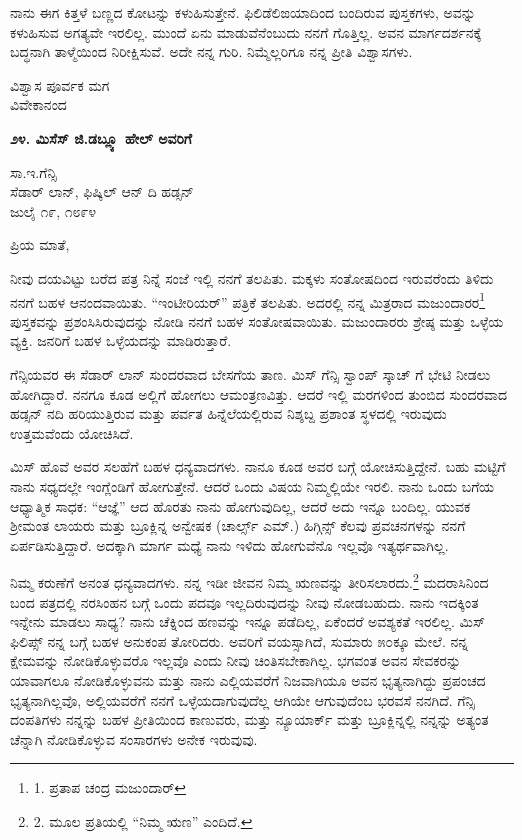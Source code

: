 ನಾನು ಈಗ ಕಿತ್ತಳೆ ಬಣ್ಣದ ಕೋಟನ್ನು ಕಳುಹಿಸುತ್ತೇನೆ. ಫಿಲಿಡೆಲಿಙಯಾದಿಂದ ಬಂದಿರುವ ಪುಸ್ತಕಗಳು, ಅವನ್ನು ಕಳುಹಿಸುವ ಅಗತ್ಯವೇ ಇರಲಿಲ್ಲ. ಮುಂದೆ ಏನು ಮಾಡುವೆನೆಂಬುದು ನನಗೆ ಗೊತ್ತಿಲ್ಲ. ಅವನ ಮಾರ್ಗದರ್ಶನಕ್ಕೆ ಬದ್ಧನಾಗಿ ತಾಳ್ಮೆಯಿಂದ ನಿರೀಕ್ಷಿಸುವೆ. ಅದೇ ನನ್ನ ಗುರಿ. ನಿಮ್ಮೆಲ್ಲರಿಗೂ ನನ್ನ ಪ್ರೀತಿ ವಿಶ್ವಾಸಗಳು.

\begin{flushright}
ವಿಶ್ವಾಸ ಪೂರ್ವಕ ಮಗ\\ವಿವೇಕಾನಂದ
\end{flushright}

\begin{center}
\textbf{೨೪. ಮಿಸೆಸ್ ಜಿ.ಡಬ್ಲ್ಯೂ ಹೇಲ್ ಅವರಿಗೆ}
\end{center}

\begin{flushright}
 ಸಾ.ಇ.ಗೆನ್ಸಿ\\ಸೆಡಾರ್ ಲಾನ್, ಫಿಷ್ಕಿಲ್ ಆನ್ ದಿ ಹಡ್ಸನ್\\ಜುಲೈ ೧೯, ೧೮೯೪
\end{flushright}

ಪ್ರಿಯ ಮಾತೆ,

ನೀವು ದಯವಿಟ್ಟು ಬರೆದ ಪತ್ರ ನಿನ್ನೆ ಸಂಜೆ ಇಲ್ಲಿ ನನಗೆ ತಲಪಿತು. ಮಕ್ಕಳು ಸಂತೋಷದಿಂದ ಇರುವರೆಂದು ತಿಳಿದು ನನಗೆ ಬಹಳ ಆನಂದವಾಯಿತು. “ಇಂಟೀರಿಯರ್” ಪತ್ರಿಕೆ ತಲಪಿತು. ಅದರಲ್ಲಿ ನನ್ನ ಮಿತ್ರರಾದ ಮಜುಂದಾರರ\footnote{1. ಪ್ರತಾಪ ಚಂದ್ರ ಮಜುಂದಾರ್} ಪುಸ್ತಕವನ್ನು ಪ್ರಶಂಸಿಸಿರುವುದನ್ನು ನೋಡಿ ನನಗೆ ಬಹಳ ಸಂತೋಷವಾಯಿತು. ಮಜುಂದಾರರು ಶ್ರೇಷ್ಠ ಮತ್ತು ಒಳ್ಳೆಯ ವ್ಯಕ್ತಿ. ಜನರಿಗೆ ಬಹಳ ಒಳ್ಳೆಯದನ್ನು ಮಾಡಿರುತ್ತಾರೆ.

ಗೆನ್ಸಿಯವರ ಈ ಸೆಡಾರ್ ಲಾನ್ ಸುಂದರವಾದ ಬೇಸಗೆಯ ತಾಣ. ಮಿಸ್ ಗೆನ್ಸಿ ಸ್ವಾಂಪ್ ಸ್ಕಾಚ್ ಗೆ ಭೇಟಿ ನೀಡಲು ಹೋಗಿದ್ದಾರೆ. ನನಗೂ ಕೂಡ ಅಲ್ಲಿಗೆ ಹೋಗಲು ಆಮಂತ್ರಣವಿತ್ತು. ಆದರೆ ಇಲ್ಲಿ ಮರಗಳಿಂದ ತುಂಬಿದ ಸುಂದರವಾದ ಹಡ್ಸನ್ ನದಿ ಹರಿಯುತ್ತಿರುವ ಮತ್ತು ಪರ್ವತ ಹಿನ್ನೆಲೆಯಲ್ಲಿರುವ ನಿಶ್ಶಬ್ದ ಪ್ರಶಾಂತ ಸ್ಥಳದಲ್ಲಿ ಇರುವುದು ಉತ್ತಮವೆಂದು ಯೋಚಿಸಿದೆ.

ಮಿಸ್ ಹೊವೆ ಅವರ ಸಲಹೆಗೆ ಬಹಳ ಧನ್ಯವಾದಗಳು. ನಾನೂ ಕೂಡ ಅವರ ಬಗ್ಗೆ ಯೋಚಿಸುತ್ತಿದ್ದೇನೆ. ಬಹು ಮಟ್ಟಿಗೆ ನಾನು ಸಧ್ಯದಲ್ಲೇ ಇಂಗ್ಲೆಂಡಿಗೆ ಹೋಗುತ್ತೇನೆ. ಆದರೆ ಒಂದು ವಿಷಯ ನಿಮ್ಮಲ್ಲಿಯೇ ಇರಲಿ. ನಾನು ಒಂದು ಬಗೆಯ ಆಧ್ಯಾತ್ಮಿಕ ಸಾಧಕ: “ಆಜ್ಞೆ” ಆದ ಹೊರತು ನಾನು ಹೋಗುವುದಿಲ್ಲ, ಆದರೆ ಅದು ಇನ್ನೂ ಬಂದಿಲ್ಲ. ಯುವಕ ಶ‍್ರೀಮಂತ ಲಾಯರು ಮತ್ತು ಬ್ರೂಕ್ಲಿನ್ನ ಅನ್ವೇಷಕ (ಚಾರ್ಲ್ಸ್ ಎಮ್​.) ಹಿಗ್ಗಿನ್ಸ್ ಕೆಲವು ಪ್ರವಚನಗಳನ್ನು ನನಗೆ ಏರ್ಪಡಿಸುತ್ತಿದ್ದಾರೆ. ಅದಕ್ಕಾಗಿ ಮಾರ್ಗ ಮಧ್ಯೆ ನಾನು ಇಳಿದು ಹೋಗುವೆನೊ ಇಲ್ಲವೊ ಇತ್ಯರ್ಥವಾಗಿಲ್ಲ.

ನಿಮ್ಮ ಕರುಣೆಗೆ ಅನಂತ ಧನ್ಯವಾದಗಳು. ನನ್ನ ಇಡೀ ಜೀವನ ನಿಮ್ಮ ಋಣವನ್ನು ತೀರಿಸಲಾರದು.\footnote{2. ಮೂಲ ಪ್ರತಿಯಲ್ಲಿ “ನಿಮ್ಮ ಋಣ” ಎಂದಿದೆ.} ಮದರಾಸಿನಿಂದ ಬಂದ ಪತ್ರದಲ್ಲಿ ನರಸಿಂಹನ ಬಗ್ಗೆ ಒಂದು ಪದವೂ ಇಲ್ಲದಿರುವುದನ್ನು ನೀವು ನೋಡಬಹುದು. ನಾನು ಇದಕ್ಕಿಂತ ಇನ್ನೇನು ಮಾಡಲು ಸಾಧ್ಯ? ನಾನು ಚೆಕ್ನಿಂದ ಹಣವನ್ನು ಇನ್ನೂ ಪಡೆದಿಲ್ಲ, ಏಕೆಂದರೆ ಅವಶ್ಯಕತೆ ಇರಲಿಲ್ಲ. ಮಿಸ್ ಫಿಲಿಪ್ಸ್ ನನ್ನ ಬಗ್ಗೆ ಬಹಳ ಅನುಕಂಪ ತೋರಿದರು. ಅವರಿಗೆ ವಯಸ್ಸಾಗಿದೆ, ಸುಮಾರು ೫೦ಕ್ಕೂ ಮೇಲೆ. ನನ್ನ ಕ್ಷೇಮವನ್ನು ನೋಡಿಕೊಳ್ಳುವರೊ ಇಲ್ಲವೊ ಎಂದು ನೀವು ಚಿಂತಿಸಬೇಕಾಗಿಲ್ಲ. ಭಗವಂತ ಅವನ ಸೇವಕರನ್ನು ಯಾವಾಗಲೂ ನೋಡಿಕೊಳ್ಳುವನು ಮತ್ತು ನಾನು ಎಲ್ಲಿಯವರೆಗೆ ನಿಜವಾಗಿಯೂ ಅವನ ಭೃತ್ಯನಾಗಿದ್ದು ಪ್ರಪಂಚದ ಭೃತ್ಯನಾಗಿಲ್ಲವೊ, ಅಲ್ಲಿಯವರೆಗೆ ನನಗೆ ಒಳ್ಳೆಯದಾಗುವುದೆಲ್ಲ ಆಗಿಯೇ ಆಗುವುದೆಂಬ ಭರವಸೆ ನನಗಿದೆ. ಗೆನ್ಸಿ ದಂಪತಿಗಳು ನನ್ನನ್ನು ಬಹಳ ಪ್ರೀತಿಯಿಂದ ಕಾಣುವರು, ಮತ್ತು ನ್ಯೂಯಾರ್ಕ್ ಮತ್ತು ಬ್ರೂಕ್ಲಿನ್ನಲ್ಲಿ ನನ್ನನ್ನು ಅತ್ಯಂತ ಚೆನ್ನಾಗಿ ನೋಡಿಕೊಳ್ಳುವ ಸಂಸಾರಗಳು ಅನೇಕ ಇರುವುವು.

